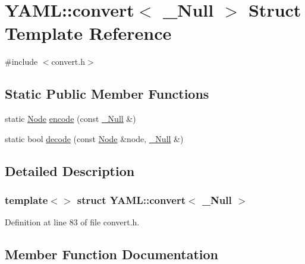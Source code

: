 \hypertarget{struct_y_a_m_l_1_1convert_3_01___null_01_4}{}\section{Y\+A\+ML\+::convert$<$ \+\_\+\+Null $>$ Struct Template Reference}
\label{struct_y_a_m_l_1_1convert_3_01___null_01_4}


{\ttfamily \#include $<$convert.\+h$>$}

\subsection*{Static Public Member Functions}
\begin{DoxyCompactItemize}
\item 
static \mbox{\hyperlink{class_y_a_m_l_1_1_node}{Node}} \mbox{\hyperlink{struct_y_a_m_l_1_1convert_3_01___null_01_4_a85aa96bac5d449722a0367916cf71746}{encode}} (const \mbox{\hyperlink{struct_y_a_m_l_1_1___null}{\+\_\+\+Null}} \&)
\item 
static bool \mbox{\hyperlink{struct_y_a_m_l_1_1convert_3_01___null_01_4_aa2d8802738bce53403ae6de6071e321a}{decode}} (const \mbox{\hyperlink{class_y_a_m_l_1_1_node}{Node}} \&node, \mbox{\hyperlink{struct_y_a_m_l_1_1___null}{\+\_\+\+Null}} \&)
\end{DoxyCompactItemize}


\subsection{Detailed Description}
\subsubsection*{template$<$$>$\newline
struct Y\+A\+M\+L\+::convert$<$ \+\_\+\+Null $>$}



Definition at line 83 of file convert.\+h.



\subsection{Member Function Documentation}
\mbox{\label{struct_y_a_m_l_1_1convert_3_01___null_01_4_aa2d8802738bce53403ae6de6071e321a}} 
